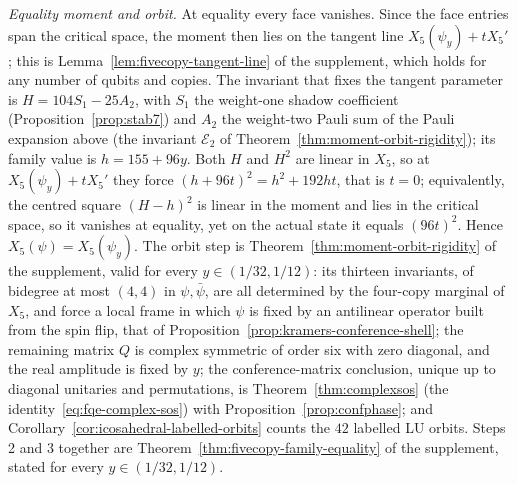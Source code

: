 \emph{Equality moment and orbit.} At equality every face vanishes. Since the face entries span the critical space, the
moment then lies on the tangent line $X_5(\psi_y)+tX_5'$; this is Lemma~\ref{lem:fivecopy-tangent-line} of the
supplement, which holds for any number of qubits and copies. The invariant that fixes the tangent parameter is $H=104S_1-25A_2$, with $S_1$
the weight-one shadow coefficient (Proposition~\ref{prop:stab7}) and $A_2$ the weight-two Pauli sum of the Pauli expansion above (the invariant $\mathcal E_2$ of Theorem~\ref{thm:moment-orbit-rigidity}); its family
value is $h=155+96y$. Both $H$ and $H^2$ are linear in $X_5$, so at $X_5(\psi_y)+tX_5'$ they force
$(h+96t)^2=h^2+192ht$, that is $t=0$; equivalently, the centred square $(H-h)^2$ is linear in the moment and lies in the critical
space, so it vanishes at equality, yet on the actual state it equals $(96t)^2$. Hence $X_5(\psi)=X_5(\psi_y)$. The orbit step is Theorem~\ref{thm:moment-orbit-rigidity} of the supplement, valid for every
$y\in(1/32,1/12)$: its thirteen invariants, of bidegree at most $(4,4)$ in $\psi,\bar\psi$, are all determined by the
four-copy marginal of $X_5$, and force a local frame in which $\psi$ is fixed by an antilinear operator built from the spin
flip, that of Proposition~\ref{prop:kramers-conference-shell}; the remaining matrix $Q$ is complex symmetric of order six
with zero diagonal, and the real amplitude is fixed by $y$; the conference-matrix conclusion, unique up to diagonal
unitaries and permutations, is Theorem~\ref{thm:complexsos} (the identity~\eqref{eq:fqe-complex-sos}) with Proposition~\ref{prop:confphase}; and
Corollary~\ref{cor:icosahedral-labelled-orbits} counts the $42$ labelled LU orbits. Steps 2 and 3 together are
Theorem~\ref{thm:fivecopy-family-equality} of the supplement, stated for every $y\in(1/32,1/12)$.
